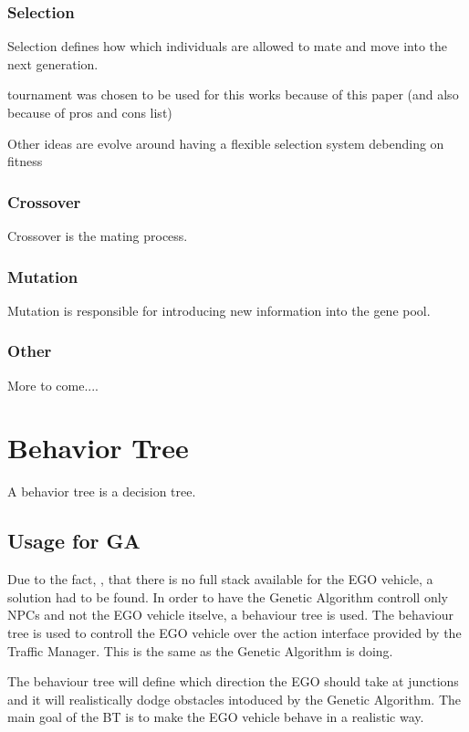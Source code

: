\subsubsection{Selection}
Selection defines how which individuals are allowed to mate and move into the next generation.

tournament was chosen to be used for this works because of this paper (and also because of pros and cons list)

Other ideas are evolve around having a flexible selection system debending on fitness 

\subsubsection{Crossover}
Crossover is the mating process.


\subsubsection{Mutation}
Mutation is responsible for introducing new information into the gene pool.


\subsubsection{Other}
More to come....

\section{Behavior Tree}
A behavior tree is a decision tree. 

\subsection{Usage for GA}
Due to the fact, , that there is no full stack available for the EGO vehicle, a solution had to be found.
In order to have the Genetic Algorithm controll only NPCs and not the EGO vehicle itselve, a behaviour tree is used.
The behaviour tree is used to controll the EGO vehicle over the action interface provided by the Traffic Manager. This is the same as the Genetic Algorithm is doing.

The behaviour tree will define which direction the EGO should take at junctions and it will realistically dodge obstacles intoduced by the Genetic Algorithm. The main goal of the BT is to make the EGO vehicle behave in a realistic way.

